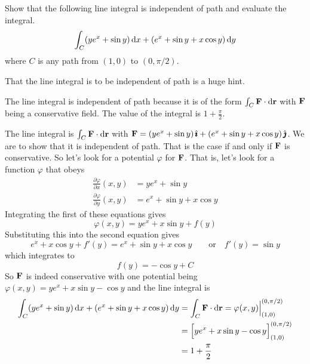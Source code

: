 \begin{question}[M317 2006D] %
Show that the following line integral is independent of path and 
evaluate the integral.
\begin{align*}
\int_C (ye^x + \sin y)\,\mathrm{d}x + (e^x + \sin y + x \cos y)\,\mathrm{d}y
\end{align*}
where $C$ is any path from $(1, 0)$ to $(0, \pi/2)$.
\end{question}

\begin{hint} 
That the line integral is to be independent of path is a huge hint.
\end{hint}

\begin{answer} 
The line integral is independent of path because it is of the form 
$\int_C \mathbf{F}\cdot\mathrm{d}\mathbf{r}$ with $\mathbf{F}$ being a conservative field. The value
of the integral is $1+\frac{\pi}{2}$.
\end{answer}

\begin{solution}

The line integral is $\int_C \mathbf{F}\cdot\mathrm{d}\mathbf{r}$ with
$\mathbf{F} = (ye^x + \sin y)\,\hat{\pmb{\imath}} + (e^x + \sin y + x \cos y)\,\hat{\pmb{\jmath}}$.
We are to show that it is independent of path. That is the case if and
only if $\mathbf{F}$ is conservative. So let's look for a potential $\varphi$
for $\mathbf{F}$. That is, let's look for a function $\varphi$ that obeys
\begin{align*}
\frac{\partial \varphi}{\partial x}(x,y) 
&= ye^x + \sin y \\
\frac{\partial \varphi}{\partial y}(x,y) &= e^x + \sin y + x \cos y 
\end{align*}
Integrating the first of these equations gives
\begin{equation*}
\varphi(x,y) = ye^x + x\sin y + f(y)
\end{equation*}
Substituting this into the second equation gives 
\begin{equation*}
e^x + x\cos y + f'(y) = e^x + \sin y + x \cos y\qquad\text{or}\quad
f'(y) = \sin y
\end{equation*}
which integrates to
\begin{equation*}
f(y) = -\cos y + C
\end{equation*}
So $\mathbf{F}$ is indeed conservative with one potential being
$\varphi(x,y) = ye^x + x\sin y -\cos y$ and the line integral is
\begin{align*}
\int_C (ye^x + \sin y)\,\mathrm{d}x + (e^x + \sin y + x \cos y)\,\mathrm{d}y
&=\int_C \mathbf{F}\cdot\mathrm{d}\mathbf{r}
=\varphi(x,y)\Big|^{(0,\pi/2)}_{(1,0)} \\
&=\Big[ye^x + x\sin y -\cos y\Big]^{(0,\pi/2)}_{(1,0)} \\
&=1+\frac{\pi}{2}
\end{align*}

\end{solution}

